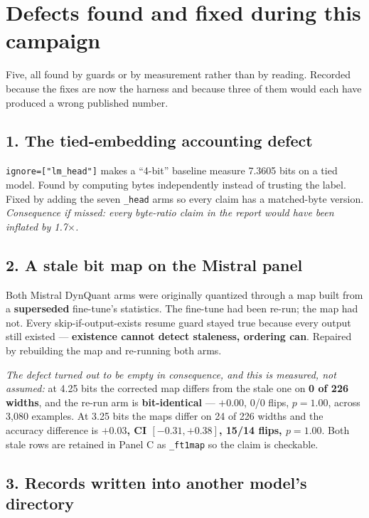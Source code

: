 \documentclass[11pt]{article}
\newcommand{\x}{\texorpdfstring{$\times$}{x}}
\newcommand{\code}[1]{\texttt{#1}}
\begin{document}
\section{Defects found and fixed during this campaign}
\label{sec:defects}

Five, all found by guards or by measurement rather than by reading. Recorded because the fixes are
now the harness and because three of them would each have produced a wrong published number.

\subsection*{1. The tied-embedding accounting defect}

\code{ignore=["lm\_head"]} makes a ``4-bit'' baseline measure 7.3605 bits on a tied model. Found
by computing bytes independently instead of trusting the label. Fixed by adding the seven
\code{\_head} arms so every claim has a matched-byte version. \emph{Consequence if missed: every
byte-ratio claim in the report would have been inflated by 1.7\x.}

\subsection*{2. A stale bit map on the Mistral panel}

Both Mistral DynQuant arms were originally quantized through a map built from a
\textbf{superseded} fine-tune's statistics. The fine-tune had been re-run; the map had not. Every
skip-if-output-exists resume guard stayed true because every output still existed ---
\textbf{existence cannot detect staleness, ordering can}. Repaired by rebuilding the map and
re-running both arms.

\emph{The defect turned out to be empty in consequence, and this is measured, not assumed:} at
4.25 bits the corrected map differs from the stale one on \textbf{0 of 226 widths}, and the re-run
arm is \textbf{bit-identical} --- $+0.00$, 0/0 flips, $p = 1.00$, across 3{,}080 examples. At 3.25
bits the maps differ on 24 of 226 widths and the accuracy difference is \textbf{$+0.03$, CI
$[-0.31, +0.38]$, 15/14 flips, $p = 1.00$}. Both stale rows are retained in Panel C as
\code{\_ft1map} so the claim is checkable.

\subsection*{3. Records written into another model's directory}
\end{document}
